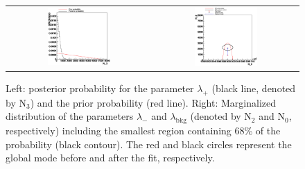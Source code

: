 \documentclass[11pt, a4paper]{article}
\begin{document}
\begin{figure}
\begin{center}
\begin{tabular}{cc}
\includegraphics[width=0.45\textwidth]{./fig/lambda_fplus.eps} & 
\includegraphics[width=0.45\textwidth]{./fig/lambda_fminus_vs_fbkg.eps}
\end{tabular}
\caption{Left: posterior probability for the parameter $\lambda_{+}$
(black line, denoted by N$_{3}$) and the prior probability (red
line). Right: Marginalized distribution of the parameters
$\lambda_{-}$ and $\lambda_{\mathrm{bkg}}$ (denoted by N$_{2}$ and
N$_{0}$, respectively) including the smallest region containing 68\%
of the probability (black contour). The red and black circles
represent the global mode before and after the fit, respectively.}
\label{fig:marg}
\end{center}
\end{figure}
\end{document}
